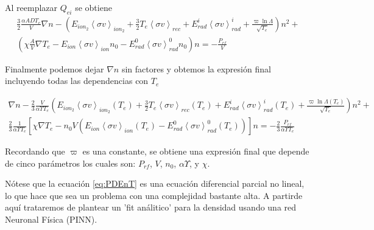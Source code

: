 \documentclass[11pt]{article}
\theoremstyle{definition}
\begin{document}
  Al reemplazar $Q_{ei}$ se obtiene
  \begin{eqnarray*}
    \frac{3}{2}\frac{\alpha AD T_e}{V}\nabla n - \left(E_{ion_2}\left<\sigma v\right>_{ion_2} + \frac{3}{2}T_e\left<\sigma v\right>_{rec} + E_{rad}^i\left<\sigma v\right>_{rad}^i + \frac{\varpi \ln{\Lambda}}{\sqrt{T_e}}\right)n^2 + \\ \left(\chi\frac{A}{V}\nabla T_e - E_{ion}\left<\sigma v\right>_{ion}n_0 - E_{rad}^0\left<\sigma v\right>_{rad}^0n_0\right)n = - \frac{P_{rf}}{V}
  \end{eqnarray*}

  Finalmente podemos dejar $\nabla n$ sin factores y obtemos la expresi\'on final incluyendo todas las dependencias con $T_e$

  \begin{eqnarray}\label{eq:PDEnT}
    \nabla n - \frac{2}{3}\frac{V}{\alpha \varUpsilon T_e}\left(E_{ion_2}\left<\sigma v\right>_{ion_2}(T_e) + \frac{3}{2}T_e\left<\sigma v\right>_{rec}(T_e) + E_{rad}^i\left<\sigma v\right>_{rad}^i(T_e) + \frac{\varpi\ln{\Lambda}(T_e)}{\sqrt{T_e}}\right)n^2 + \nonumber\\ \frac{2}{3}\frac{1}{\alpha\varUpsilon T_e}\left[\chi\nabla T_e - n_0V\left(E_{ion}\left<\sigma v\right>_{ion}(T_e) - E_{rad}^0\left<\sigma v\right>_{rad}^0(T_e)\right)\right]n = -\frac{2}{3}\frac{P_{rf}}{\alpha \varUpsilon T_e}
  \end{eqnarray}

  Recordando que $\varpi$ es una constante, se obtiene una expresi\'on final que depende de cinco par\'ametros los cuales son: $P_{rf}$, $V$, $n_0$, $\alpha\varUpsilon$, y $\chi$. 

  N\'otese que la ecuaci\'on \eqref{eq:PDEnT} es una ecuaci\'on diferencial parcial no lineal, lo que hace que sea un problema con una complejidad bastante alta. A partirde aqu\'i trataremos de plantear un 'fit an\'alitico' para la densidad usando una red Neuronal F\'isica (PINN). 
  
  
\end{document}
